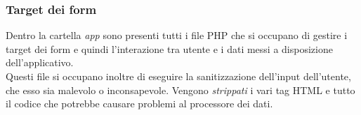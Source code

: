 \subsubsection{Target dei form}
Dentro la cartella \textit{app} sono presenti tutti i file PHP che si occupano di gestire i target dei form e quindi l'interazione tra utente e i dati messi a disposizione dell'applicativo.\\
Questi file si occupano inoltre di eseguire la sanitizzazione dell'input dell'utente, che esso sia malevolo o inconsapevole. Vengono \textit{strippati} i vari tag HTML e tutto il codice che potrebbe causare problemi al processore dei dati.
